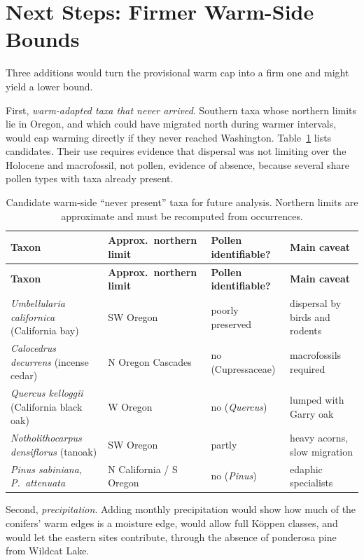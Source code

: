 \documentclass[11pt]{article}
\newcommand{\Kop}{K\"oppen}
\begin{document}
\section{Next Steps: Firmer Warm-Side Bounds}\label{sec:next}

Three additions would turn the provisional warm cap into a firm one and might yield a lower bound.

First, \emph{warm-adapted taxa that never arrived}. Southern taxa whose northern limits lie in Oregon, and which could have migrated north during warmer intervals, would cap warming directly if they never reached Washington. Table~\ref{tab:candidates} lists candidates. Their use requires evidence that dispersal was not limiting over the Holocene and macrofossil, not pollen, evidence of absence, because several share pollen types with taxa already present.

{\small
\begin{longtable}{>{\raggedright\arraybackslash}p{}>{\raggedright\arraybackslash}p{}>{\raggedright\arraybackslash}p{}>{\raggedright\arraybackslash}p{}}
\caption{Candidate warm-side ``never present'' taxa for future analysis. Northern limits are approximate and must be recomputed from occurrences.}\label{tab:candidates}\\
\toprule
\textbf{Taxon} & \textbf{Approx.\ northern limit} & \textbf{Pollen identifiable?} & \textbf{Main caveat} \\
\midrule
\endfirsthead
\toprule
\textbf{Taxon} & \textbf{Approx.\ northern limit} & \textbf{Pollen identifiable?} & \textbf{Main caveat} \\
\midrule
\endhead
\bottomrule
\endfoot
\emph{Umbellularia californica} (California bay) & SW Oregon & poorly preserved & dispersal by birds and rodents \\
\emph{Calocedrus decurrens} (incense cedar) & N Oregon Cascades & no (Cupressaceae) & macrofossils required \\
\emph{Quercus kelloggii} (California black oak) & W Oregon & no (\emph{Quercus}) & lumped with Garry oak \\
\emph{Notholithocarpus densiflorus} (tanoak) & SW Oregon & partly & heavy acorns, slow migration \\
\emph{Pinus sabiniana}, \emph{P.\ attenuata} & N California / S Oregon & no (\emph{Pinus}) & edaphic specialists \\
\end{longtable}
}

Second, \emph{precipitation}. Adding monthly precipitation would show how much of the conifers' warm edges is a moisture edge, would allow full \Kop{} classes, and would let the eastern sites contribute, through the absence of ponderosa pine from Wildcat Lake.
\end{document}
